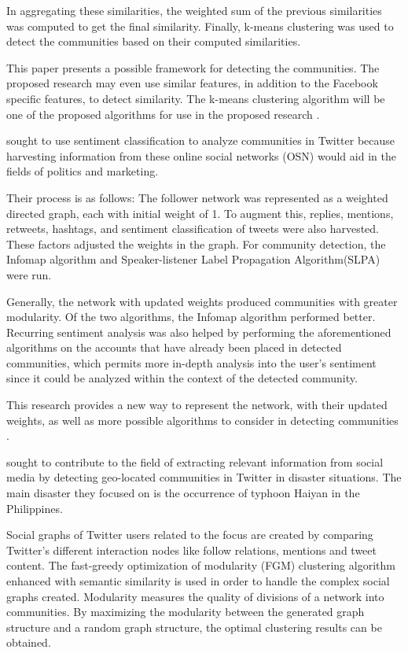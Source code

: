 In aggregating these similarities, the weighted sum of the previous similarities was computed to get the final similarity. Finally, k-means clustering was used to detect the communities based on their computed similarities. 

This paper presents a possible framework for detecting the communities. The proposed research may even use similar features, in addition to the Facebook specific features, to detect similarity. The k-means clustering algorithm will be one of the proposed algorithms for use in the proposed research \cite{Zhang:2012}.

 sought to use sentiment classification to analyze communities in Twitter because harvesting information from these online social networks (OSN) would aid in the fields of politics and marketing. 

Their process is as follows: The follower network was represented as a weighted directed graph, each with initial weight of 1. To augment this, replies, mentions, retweets, hashtags, and sentiment classification of tweets were also harvested. These factors adjusted the weights in the graph. For community detection, the Infomap algorithm and Speaker-listener Label Propagation Algorithm(SLPA) were run. 

Generally, the network with updated weights produced communities with greater modularity. Of the two algorithms, the Infomap algorithm performed better. Recurring sentiment analysis was also helped by performing the aforementioned algorithms on the accounts that have already been placed in detected communities, which permits more in-depth analysis into the user’s sentiment since it could be analyzed within the context of the detected community.

This research provides a new way to represent the network, with their updated weights, as well as more possible algorithms to consider in detecting communities \cite{Deitrick:2013}.

 sought to contribute to the field of extracting relevant information from social media by detecting geo-located communities in Twitter in disaster situations. The main disaster they focused on is the occurrence of typhoon Haiyan in the Philippines. 

Social graphs of Twitter users related to the focus are created by comparing Twitter's different interaction nodes like follow relations, mentions and tweet content. The fast-greedy optimization of modularity (FGM) clustering algorithm enhanced with semantic similarity is used in order to handle the complex social graphs created. Modularity measures the quality of divisions of a network into communities. By maximizing the modularity between the generated graph structure and a random graph structure, the optimal clustering results can be obtained. 

